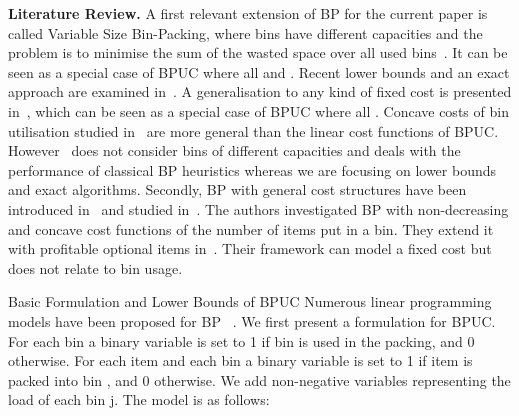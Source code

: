 \noindent\textbf{Literature Review.} 
A first relevant extension of BP for the current paper is called Variable Size Bin-Packing, where bins have different capacities and the problem is to minimise the sum of the wasted space over all used bins~\cite{Monaci2002}. It can be seen as a special case of BPUC where all  and . 
Recent lower bounds and an exact approach are examined in~\cite{Haouari:2011}.
A generalisation to any kind of fixed cost is presented in~\cite{Crainic2011}, which can be seen as a special case of BPUC where all . 
Concave costs of bin utilisation  studied in~\cite{Li2006} are more general than the linear cost functions of BPUC. However~\cite{Li2006} does not consider bins of different capacities and deals with the performance of classical BP heuristics whereas we are focusing on lower bounds and exact algorithms.
Secondly, BP with general cost structures have been introduced in~\cite{AnilyBS94} and studied in~\cite{Epstein:2012}. The authors investigated BP with non-decreasing and concave cost functions of the number of items put in a bin. They extend it with profitable optional items in~\cite{Baldi2012}. Their framework can model a fixed cost but does not relate to bin usage.






\newenvironment{equ}{\vspace{0.1cm}\vspace{1mm}}

\section{Basic Formulation and  Lower Bounds of BPUC}
 Numerous linear programming models have been proposed for BP ~\cite{DBLP:journals/eor/Carvalho02}. We first present a 
 formulation for  BPUC.
For each bin a binary variable  is set to 1 if bin  is used in the packing,
and 0 otherwise. For each item  and each bin   a binary variable  is set to 1 if item  is packed into bin , and 0 otherwise. 
We add non-negative variables  representing the load  of each bin j. The  model is as follows:

